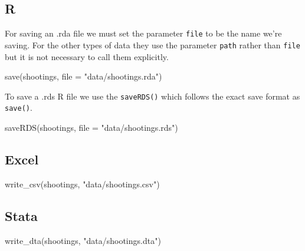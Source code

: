 \documentclass[
]{krantz}
\makeatletter
\newenvironment{Shaded}{\begin{snugshade}}{\end{snugshade}}
\newcommand{\AttributeTok}[1]{\textcolor[rgb]{0.61,0.61,0.61}{#1}}
\newcommand{\FunctionTok}[1]{\textcolor[rgb]{0,0,0}{#1}}
\newcommand{\NormalTok}[1]{#1}
\newcommand{\StringTok}[1]{\textcolor[rgb]{0.5,0.5,0.5}{#1}}
\newenvironment{kframe}{%
\medskip{}
\setlength{\fboxsep}{.8em}
 \def\at@end@of@kframe{}%
 \ifinner\ifhmode%
  \def\at@end@of@kframe{\end{minipage}}%
  \begin{minipage}{\columnwidth}%
 \fi\fi%
 \def\FrameCommand##1{\hskip\@totalleftmargin \hskip-\fboxsep
 \colorbox{shadecolor}{##1}\hskip-\fboxsep
     \hskip-\linewidth \hskip-\@totalleftmargin \hskip\columnwidth}%
 \MakeFramed {\advance\hsize-\width
   \@totalleftmargin\z@ \linewidth\hsize
   \@setminipage}}%
 {\par\unskip\endMakeFramed%
 \at@end@of@kframe}
\renewenvironment{Shaded}{\begin{kframe}}{\end{kframe}}
\makeatother
\begin{document}
\hypertarget{r-1}{%
\subsection{R}\label{r-1}}

For saving an .rda file we must set the parameter \texttt{file} to be the name we're saving. For the other types of data they use the parameter \texttt{path} rather than \texttt{file} but it is not necessary to call them explicitly.

\begin{Shaded}
\begin{Highlighting}[]
\FunctionTok{save}\NormalTok{(shootings, }\AttributeTok{file =}  \StringTok{"data/shootings.rda"}\NormalTok{)}
\end{Highlighting}
\end{Shaded}

To save a .rds R file we use the \texttt{saveRDS()} which follows the exact save format as \texttt{save()}.

\begin{Shaded}
\begin{Highlighting}[]
\FunctionTok{saveRDS}\NormalTok{(shootings, }\AttributeTok{file =}  \StringTok{"data/shootings.rds"}\NormalTok{)}
\end{Highlighting}
\end{Shaded}

\hypertarget{excel-1}{%
\subsection{Excel}\label{excel-1}}

\begin{Shaded}
\begin{Highlighting}[]
\FunctionTok{write\_csv}\NormalTok{(shootings, }\StringTok{"data/shootings.csv"}\NormalTok{)}
\end{Highlighting}
\end{Shaded}

\hypertarget{stata-1}{%
\subsection{Stata}\label{stata-1}}

\begin{Shaded}
\begin{Highlighting}[]
\FunctionTok{write\_dta}\NormalTok{(shootings, }\StringTok{"data/shootings.dta"}\NormalTok{)}
\end{Highlighting}
\end{Shaded}
\end{document}
